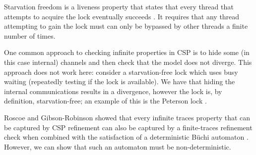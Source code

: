 Starvation freedom is a liveness property that states that every thread that attempts to acquire the lock eventually succeeds \cite{CADS}. It requires that any thread attempting to gain the lock must can only be bypassed by other threads a finite number of times.

One common approach to checking infinite properties in CSP is to hide some (in this case internal) channels and then check that the model does not diverge. This approach does not work here: consider a starvation-free lock which uses busy waiting (repeatedly testing if the lock is available). We have that hiding the internal communications results in a divergence, however the lock is, by definition, starvation-free; an example of this is the Peterson lock .

Roscoe and Gibson-Robinson showed that every infinite traces property that can be captured by CSP refinement can also be captured by a finite-traces refinement check when combined with the satisfaction of a deterministic B{\"u}chi automaton \cite{RoscoeBuchi}. However, we can show that such an automaton must be non-deterministic. 





